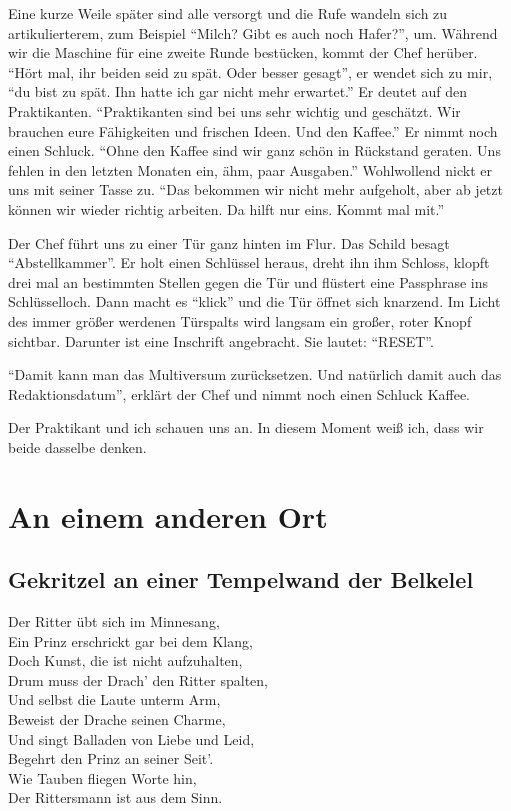 \documentclass[final]{multiversum}
\begin{document}
Eine kurze Weile später sind alle versorgt und die Rufe wandeln sich zu artikulierterem, zum Beispiel \enquote{Milch? Gibt es auch noch Hafer?}, um.
Während wir die Maschine für eine zweite Runde bestücken, kommt der Chef herüber.
\enquote{Hört mal, ihr beiden seid zu spät. Oder besser gesagt}, er wendet sich zu mir, \enquote{du bist zu spät.
Ihn hatte ich gar nicht mehr erwartet.}
Er deutet auf den Praktikanten.
\enquote{Praktikanten sind bei uns sehr wichtig und geschätzt.
Wir brauchen eure Fähigkeiten und frischen Ideen. 
Und den Kaffee.}
Er nimmt noch einen Schluck.
\enquote{Ohne den Kaffee sind wir ganz schön in Rückstand geraten. 
Uns fehlen in den letzten Monaten ein, ähm, paar Ausgaben.}
Wohlwollend nickt er uns mit seiner Tasse zu.
\enquote{Das bekommen wir nicht mehr aufgeholt, aber ab jetzt können wir wieder richtig arbeiten.
Da hilft nur eins. 
Kommt mal mit.}

Der Chef führt uns zu einer Tür ganz hinten im Flur. 
Das Schild besagt \enquote{Abstellkammer}.
Er holt einen Schlüssel heraus, dreht ihn ihm Schloss, klopft drei mal an bestimmten Stellen gegen die Tür und flüstert eine Passphrase ins Schlüsselloch.
Dann macht es \enquote{klick} und die Tür öffnet sich knarzend.
Im Licht des immer größer werdenen Türspalts wird langsam ein großer, roter Knopf sichtbar.
Darunter ist eine Inschrift angebracht.
Sie lautet: \enquote{RESET}.

\enquote{Damit kann man das Multiversum zurücksetzen.
Und natürlich damit auch das Redaktionsdatum}, erklärt der Chef und nimmt noch einen Schluck Kaffee.

Der Praktikant und ich schauen uns an.
In diesem Moment weiß ich, dass wir beide dasselbe denken.


\section{An einem anderen Ort}

\subsection{Gekritzel an einer Tempelwand der Belkelel}
Der Ritter übt sich im Minnesang,\\
Ein Prinz erschrickt gar bei dem Klang,\\
Doch Kunst, die ist nicht aufzuhalten,\\
Drum muss der Drach' den Ritter spalten,\\
Und selbst die Laute unterm Arm,\\
Beweist der Drache seinen Charme,\\
Und singt Balladen von Liebe und Leid,\\
Begehrt den Prinz an seiner Seit'.\\
Wie Tauben fliegen Worte hin,\\
Der Rittersmann ist aus dem Sinn.
\end{document}
